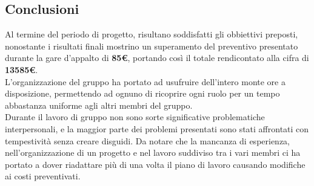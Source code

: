\subsection{Conclusioni}
Al termine del periodo di progetto, risultano soddisfatti gli obbiettivi preposti, nonostante i risultati finali mostrino un superamento del preventivo presentato durante la gare d'appalto di \textbf{85€}, portando così il totale rendicontato alla cifra di \textbf{13585€}. \\
L'organizzazione del gruppo ha portato ad usufruire dell'intero monte ore a disposizione, permettendo ad ognuno di ricoprire ogni ruolo per un tempo abbastanza uniforme agli altri membri del gruppo. \\
Durante il lavoro di gruppo non sono sorte significative problematiche interpersonali, e la maggior parte dei problemi presentati sono stati affrontati con tempestività senza creare disguidi. Da notare che la mancanza di esperienza, nell'organizzazione di un progetto e nel lavoro suddiviso tra i vari membri ci ha portato a dover riadattare più di una volta il piano di lavoro causando modifiche ai costi preventivati.